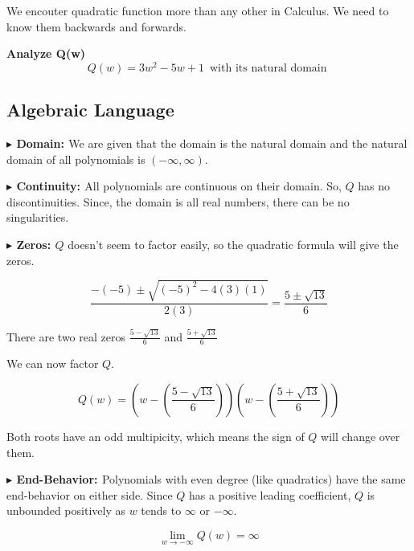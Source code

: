 \documentclass{ximera}
\author{Lee Wayand}
\begin{document}
\begin{exercise}



We encouter quadratic function more than any other in Calculus.  We need to know them backwards and forwards. 


\textbf{Analyze Q(w)} \\

\[
Q(w) = 3 w^2 -5 w + 1 \, \text { with its natural domain } 
\]






\subsection{Algebraic Language}



\textbf{\textcolor{blue!55!black}{$\blacktriangleright$ Domain: }} We are given that the domain is the natural domain and the natural domain of all polynomials is $(-\infty, \infty)$.


\textbf{\textcolor{blue!55!black}{$\blacktriangleright$ Continuity: }}  All polynomials are continuous on their domain.  So, $Q$ has no discontinuities.  Since, the domain is all real numbers, there can be no singularities.



\textbf{\textcolor{blue!55!black}{$\blacktriangleright$ Zeros: }}  $Q$ doesn't seem to factor easily, so the quadratic formula will give the zeros.


\[
\frac{-(-5) \pm \sqrt{(-5)^2 - 4 (3) (1)}}{2(3)} = \frac{5 \pm \sqrt{13}}{6}
\]


There are two real zeros $\frac{5 - \sqrt{13}}{6}$ and $\frac{5 + \sqrt{13}}{6}$



We can now factor $Q$.

\[
Q(w) = \left(w - \left( \frac{5 - \sqrt{13}}{6} \right) \right) \left(w - \left( \frac{5 + \sqrt{13}}{6} \right) \right)
\]

Both roots have an odd multipicity, which means the sign of $Q$ will change over them.




\textbf{\textcolor{blue!55!black}{$\blacktriangleright$ End-Behavior: }} Polynomials with even degree (like quadratics) have the same end-behavior on either side.  Since $Q$ has a positive leading coefficient, $Q$ is unbounded positively as $w$ tends to $\infty$ or $-\infty$.

\[
\lim\limits_{w \to -\infty} Q(w) = \infty
\]



\end{exercise}
\end{document}
